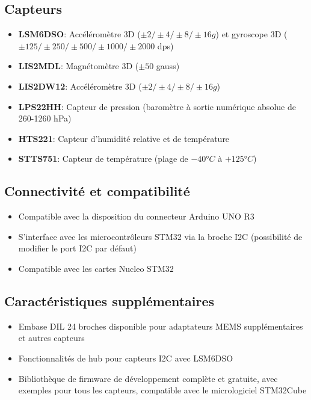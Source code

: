 \documentclass[12pt]{article}
\begin{document}
\subsection{Capteurs}
\begin{itemize}
    \item \textbf{LSM6DSO}: Accéléromètre 3D ($\pm2/\pm4/\pm8/\pm16g$) et gyroscope 3D ($\pm125/\pm250/\pm500/\pm1000/\pm2000$ dps)
    \item \textbf{LIS2MDL}: Magnétomètre 3D ($\pm50$ gauss)
    \item \textbf{LIS2DW12}: Accéléromètre 3D ($\pm2/\pm4/\pm8/\pm16g$)
    \item \textbf{LPS22HH}: Capteur de pression (baromètre à sortie numérique absolue de 260-1260 hPa)
    \item \textbf{HTS221}: Capteur d'humidité relative et de température
    \item \textbf{STTS751}: Capteur de température (plage de $-40°C$ à $+125°C$)
\end{itemize}

\subsection{Connectivité et compatibilité}
\begin{itemize}
    \item Compatible avec la disposition du connecteur Arduino UNO R3
    \item S'interface avec les microcontrôleurs STM32 via la broche I2C (possibilité de modifier le port I2C par défaut)
    \item Compatible avec les cartes Nucleo STM32
\end{itemize}

\subsection{Caractéristiques supplémentaires}
\begin{itemize}
    \item Embase DIL 24 broches disponible pour adaptateurs MEMS supplémentaires et autres capteurs
    \item Fonctionnalités de hub pour capteurs I2C avec LSM6DSO
    \item Bibliothèque de firmware de développement complète et gratuite, avec exemples pour tous les capteurs, compatible avec le micrologiciel STM32Cube
\end{itemize}
\end{document}
